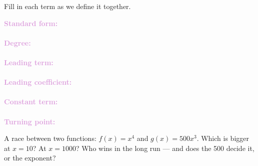 \documentclass[10pt]{article}
\begin{document}

\vspace{0.12in}

\boxguard
\begin{vocabbox}
Fill in each term as we define it together.
\par\vspace{2pt}
\noindent\textbf{\textcolor{plum}{Standard form:}}\\[1pt]
\writeline\\[3pt]
\noindent\textbf{\textcolor{plum}{Degree:}}\\[1pt]
\writeline\\[3pt]
\noindent\textbf{\textcolor{plum}{Leading term:}}\\[1pt]
\writeline\\[3pt]
\noindent\textbf{\textcolor{plum}{Leading coefficient:}}\\[1pt]
\writeline\\[3pt]
\noindent\textbf{\textcolor{plum}{Constant term:}}\\[1pt]
\writeline\\[3pt]
\noindent\textbf{\textcolor{plum}{Turning point:}}\\[1pt]
\writeline
\end{vocabbox}

\vspace{0.1in}

\boxguard
\begin{hookbox}
A race between two functions: $f(x) = x^4$ and $g(x) = 500x^3$. Which is bigger at $x = 10$?
At $x = 1000$? Who wins in the long run --- and does the 500 decide it, or the exponent?
\par{}
\end{hookbox}
\end{document}
